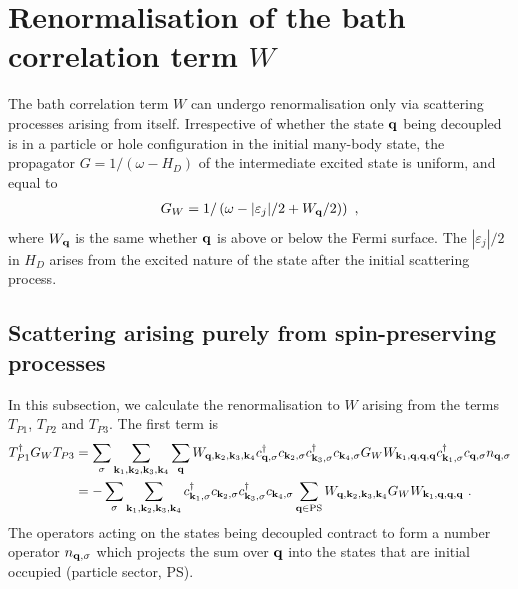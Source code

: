 \documentclass{revtex4-2}
\begin{document}
\section{Renormalisation of the bath correlation term \(W\)}
The bath correlation term \(W\) can undergo renormalisation only via scattering processes arising from itself. Irrespective of whether the state \({\bf q}\) being decoupled is in a particle or hole configuration in the initial many-body state, the propagator \(G = 1/(\omega - H_D)\) of the intermediate excited state is uniform, and equal to 
\begin{equation}\begin{aligned}\label{propagatorW}
	G_W = 1/\left(\omega - |\varepsilon_j|/2 + W_{\bf q}/2)\right)~,
\end{aligned}\end{equation}
where \(W_{\bf q}\) is the same whether \({\bf q}\) is above or below the Fermi surface. The \(|\varepsilon_j|/2\) in \(H_D\) arises from the excited nature of the state after the initial scattering process.

\subsection{Scattering arising purely from spin-preserving processes}
In this subsection, we calculate the renormalisation to \(W\) arising from the terms \(T_{P1}\), \(T_{P2}\) and \(T_{P3}\). The first term is
\begin{equation}\begin{aligned}
	T_{P1}^\dagger G_W T_{P3} &= \sum_\sigma\sum_{{\bf k}_1, {\bf k}_2, {\bf k}_3, {\bf k}_4} \sum_{\bf q} W_{{\bf q},{\bf k}_2,{\bf k}_3,{\bf k}_4}c^\dagger_{{\bf q},\sigma}c_{{\bf k}_2,\sigma}c^\dagger_{{\bf k}_3,\sigma}c_{{\bf k}_4,\sigma} G_W W_{{\bf k}_1,{\bf q},{\bf q},{\bf q}} c^\dagger_{{\bf k}_1,\sigma}c_{{\bf q},\sigma} n_{{\bf q},\sigma}\\
							  &= -\sum_\sigma\sum_{{\bf k}_1, {\bf k}_2, {\bf k}_3, {\bf k}_4} c^\dagger_{{\bf k}_1,\sigma} c_{{\bf k}_2,\sigma}c^\dagger_{{\bf k}_3,\sigma}c_{{\bf k}_4,\sigma} \sum_{\bf q \in \text{PS}} W_{{\bf q},{\bf k}_2,{\bf k}_3,{\bf k}_4} G_W W_{{\bf k}_1,{\bf q},{\bf q},{\bf q}}~.
\end{aligned}\end{equation}
The operators acting on the states being decoupled contract to form a number operator \(n_{{\bf q},\sigma}\) which projects the sum over \({\bf q}\) into the states that are initial occupied (particle sector, PS). 
\end{document}
